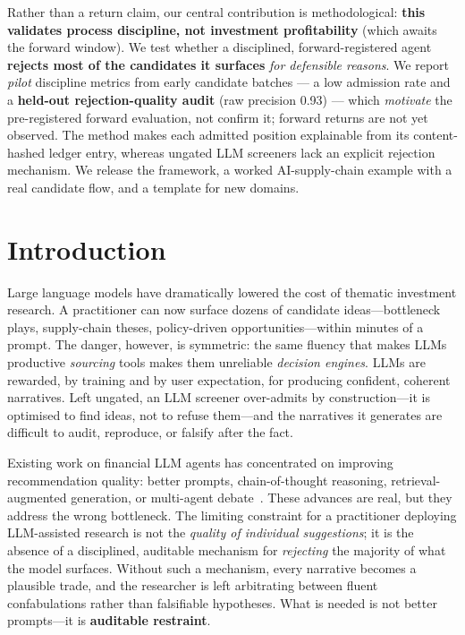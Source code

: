 \documentclass[11pt]{article}
\renewenvironment{abstract}{\begin{center}\bfseries\abstractname\end{center}\par\noindent\ignorespaces}{\par\medskip}
\begin{document}
\begin{abstract}
Rather than a return claim, our central contribution is methodological: \textbf{this validates
process discipline, not investment profitability} (which awaits the forward window). We test whether
a disciplined, forward-registered agent \textbf{rejects most of the candidates it surfaces}
\emph{for defensible reasons}. We report \emph{pilot} discipline metrics from early candidate batches
--- a low admission rate and a \textbf{held-out rejection-quality audit} (raw precision 0.93) ---
which \emph{motivate} the pre-registered forward evaluation, not confirm it; forward returns are not
yet observed. The method makes each admitted position
explainable from its content-hashed ledger entry, whereas ungated LLM screeners lack an
explicit rejection mechanism. We release the framework, a worked AI-supply-chain example with a real
candidate flow, and a template for new domains.
\end{abstract}

\section{Introduction}

Large language models have dramatically lowered the cost of thematic investment research.
A practitioner can now surface dozens of candidate ideas---bottleneck plays, supply-chain
theses, policy-driven opportunities---within minutes of a prompt.
The danger, however, is symmetric: the same fluency that makes LLMs productive \emph{sourcing}
tools makes them unreliable \emph{decision engines}.
LLMs are rewarded, by training and by user expectation, for producing confident, coherent
narratives.
Left ungated, an LLM screener over-admits by construction---it is optimised to find ideas,
not to refuse them---and the narratives it generates are difficult to audit, reproduce, or
falsify after the fact.

Existing work on financial LLM agents has concentrated on improving recommendation quality:
better prompts, chain-of-thought reasoning, retrieval-augmented generation, or multi-agent
debate~\citep{xiao2024tradingagents,du2024multiagentdebate}.
These advances are real, but they address the wrong bottleneck.
The limiting constraint for a practitioner deploying LLM-assisted research is not the
\emph{quality of individual suggestions}; it is the absence of a disciplined, auditable
mechanism for \emph{rejecting} the majority of what the model surfaces.
Without such a mechanism, every narrative becomes a plausible trade, and the researcher
is left arbitrating between fluent confabulations rather than falsifiable hypotheses.
What is needed is not better prompts---it is \textbf{auditable restraint}.
\end{document}
